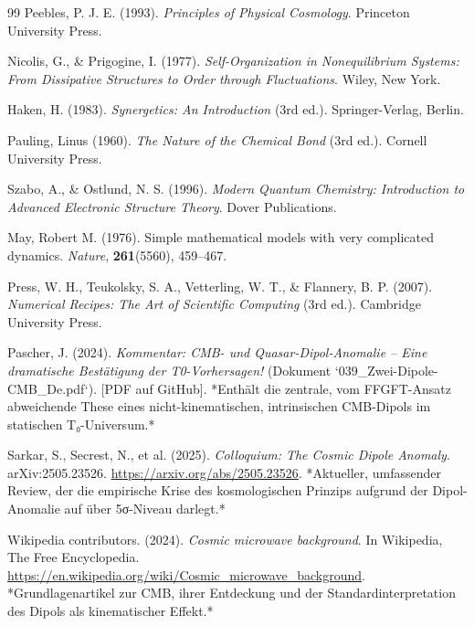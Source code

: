 \documentclass[12pt,a4paper]{article}
\begin{document}
\begin{thebibliography}{99}
		Peebles, P. J. E. (1993). \textit{Principles of Physical Cosmology}. 
		Princeton University Press.
		
		Nicolis, G., \& Prigogine, I. (1977). \textit{Self-Organization in Nonequilibrium Systems: From Dissipative Structures to Order through Fluctuations}. 
		Wiley, New York.
		
		Haken, H. (1983). \textit{Synergetics: An Introduction} (3rd ed.). 
		Springer-Verlag, Berlin.
		
		Pauling, Linus (1960). \textit{The Nature of the Chemical Bond} (3rd ed.). 
		Cornell University Press.
		
		Szabo, A., \& Ostlund, N. S. (1996). \textit{Modern Quantum Chemistry: Introduction to Advanced Electronic Structure Theory}. 
		Dover Publications.
		
		May, Robert M. (1976). Simple mathematical models with very complicated dynamics. 
		\textit{Nature}, \textbf{261}(5560), 459--467.
		
		Press, W. H., Teukolsky, S. A., Vetterling, W. T., \& Flannery, B. P. (2007). \textit{Numerical Recipes: The Art of Scientific Computing} (3rd ed.). 
		Cambridge University Press.
		
		Pascher, J. (2024). \textit{Kommentar: CMB- und Quasar-Dipol-Anomalie – Eine dramatische Bestätigung der T0-Vorhersagen!} (Dokument `039\_Zwei-Dipole-CMB\_De.pdf`).
		[PDF auf GitHub].
		*Enthält die zentrale, vom FFGFT-Ansatz abweichende These eines nicht-kinematischen, intrinsischen CMB-Dipols im statischen T₀-Universum.*
		
		Sarkar, S., Secrest, N., et al. (2025). \textit{Colloquium: The Cosmic Dipole Anomaly}. 
		arXiv:2505.23526.
		\href{https://arxiv.org/abs/2505.23526}{https://arxiv.org/abs/2505.23526}.
		*Aktueller, umfassender Review, der die empirische Krise des kosmologischen Prinzips aufgrund der Dipol-Anomalie auf über 5σ-Niveau darlegt.*
		
		Wikipedia contributors. (2024). \textit{Cosmic microwave background}. 
		In Wikipedia, The Free Encyclopedia.
		\href{https://en.wikipedia.org/wiki/Cosmic_microwave_background}{https://en.wikipedia.org/wiki/Cosmic\_microwave\_background}.
		*Grundlagenartikel zur CMB, ihrer Entdeckung und der Standardinterpretation des Dipols als kinematischer Effekt.*
		

\end{thebibliography}
\end{document}
